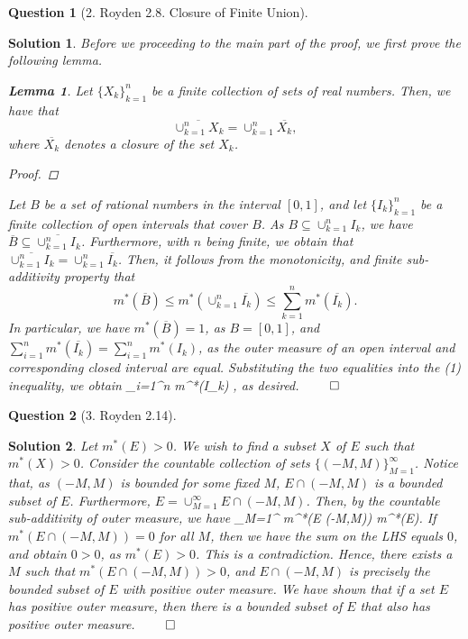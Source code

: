 \documentclass{article} %
\def\eQb#1\eQe{\begin{eqnarray*}#1\end{eqnarray*}}
\theoremstyle{quest}
\newtheorem*{lemma}{Lemma}
\newtheorem*{question}{Question}
\newtheorem*{solution}{Solution}
\begin{document}
\bigskip

\begin{question}[2. Royden 2.8. Closure of Finite Union]
\end{question}
\begin{solution}
Before we proceeding to the main part of the proof, we first prove the following lemma.
\begin{lemma}
Let $\{ X_k \}_{k=1}^{n}$ be a finite collection of sets of real numbers. Then, we have that
\[
\overline{\cup_{k=1}^{n} X_k } = \cup_{k=1}^{n} \overline{X_k},
\]
where $\overline{X_k}$ denotes a closure of the set $X_k$.
\end{lemma}
\begin{proof}
\end{proof}

Let $B$ be a set of rational numbers in the interval $[0,1]$, and let $\{ I_k \}_{k=1}^{n}$ be a 
finite collection of open intervals that cover $B$.
As $B \subseteq \cup_{k=1}^{n} I_k$, we have $\overline{B} \subseteq 
\overline{\cup_{k=1}^{n}I_k}$. Furthermore, with $n$ 
being finite, we obtain that $\overline{\cup_{k=1}^{n} I_k} =
\cup_{k=1}^{n} \overline{I_k}$. Then, it follows from the monotonicity, and finite sub-additivity
property that 
\begin{equation}
m^{*}(\overline{B}) \leq m^{*}( \cup_{k=1}^{n} \overline{ I_k } ) \leq \sum_{k=1}^{n} 
m^{*}(\overline{I_k}).
\end{equation}
In particular, we have $m^{*}(\overline{B}) = 1$, as $B = [0,1]$, and 
$\sum_{i=1}^{n} m^{*}(\overline{I_k}) = \sum_{i=1}^{n} m^{*}(I_k)$, as the outer measure
of an open interval and corresponding closed interval are equal. Substituting the two
equalities into the (1) inequality, we obtain
\eQb
\sum_{i=1}^{n} m^{*}(I_k) ,
\eQe
as desired. $\qed$
\end{solution}

\bigskip

\begin{question}[3. Royden 2.14]
\end{question}
\begin{solution}
Let $m^{*}(E) > 0$. We wish to find a subset $X$ of $E$ such that $m^{*}(X) > 0$. 
Consider the countable collection of sets $\{ (-M,M) \}_{M=1}^{\infty}$. Notice that,
as $(-M,M)$ is bounded for some fixed $M$,
$E \cap (-M,M)$ is a bounded subset of $E$. Furthermore,
$ E = \cup_{M=1}^{\infty} E\cap (-M,M)$.
Then, by the countable sub-additivity of outer measure, we have
\eQb
\sum_{M=1}^{\infty} m^{*}(E \cap (-M,M)) \geq m^{*}(E).
\eQe
If $m^{*}(E \cap (-M,M)) = 0$ for all $M$, then we have the sum on the LHS equals $0$, and obtain
$0 > 0$, as $m^{*}(E) > 0$. This is a contradiction. Hence, there exists a $M$ such that
$m^{*}(E \cap (-M,M)) > 0$, and $E \cap (-M,M)$ is precisely the bounded subset of $E$ with
positive outer measure. We have shown that if a set $E$ has positive outer measure,
then there is a bounded subset of $E$ that also has positive outer measure. $\qed$

\end{solution}
\end{document}
